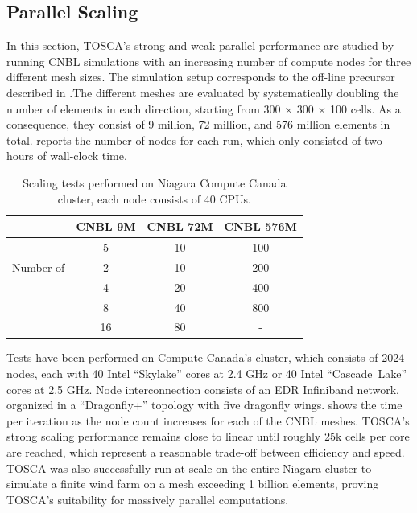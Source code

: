 \subsection{Parallel Scaling}
\label{subsec:parallelScaling}
In this section, TOSCA's strong and weak parallel performance are studied by running CNBL simulations with an increasing number of compute nodes for three different mesh sizes. The simulation setup corresponds to the off-line precursor described in .The different meshes are evaluated by systematically doubling the number of elements in each direction, starting from 300 $\times$ 300 $\times$ 100 cells. As a consequence, they consist of 9 million, 72 million, and 576 million elements in total.  reports the number of nodes for each run, which only consisted of two hours of wall-clock time. 
\begin{table}[H]
	\begin{center}
		\begin{tabular}{c | c c c} 
			& CNBL 9M & CNBL 72M & CNBL 576M \\
			\hline
			\multirow{3}{*}{Number of}  &  5 &  10 & 100 \\
			& 2 &  10 &  200 \\
			\multirow{2}{*}{Niagara Nodes}& 4 &  20 &  400 \\
			& 8 &  40 &  800 \\
			& 16 &  80 &  - \\
		\end{tabular}
	\end{center}
	\caption[Scaling tests performed on Niagara Compute Canada cluster]{Scaling tests performed on Niagara Compute Canada cluster, each node consists of 40 CPUs. }
	\label{tab:scalingTests}
\end{table}
Tests have been performed on Compute Canada's \cite{Niagara} cluster, which consists of 2024 nodes, each with 40 Intel ``Skylake'' cores at 2.4 GHz or 40 Intel ``Cascade~Lake'' cores at 2.5 GHz. Node interconnection consists of an EDR Infiniband network, organized in a ``Dragonfly+'' topology with five dragonfly wings.  shows the time per iteration as the node count increases for each of the CNBL meshes. TOSCA's strong scaling performance remains close to linear until roughly 25k cells per core are reached, which represent a reasonable trade-off between efficiency and speed. TOSCA was also successfully run at-scale on the entire Niagara cluster to simulate a finite wind farm on a mesh exceeding 1 billion elements, proving TOSCA's suitability for massively parallel computations. 

